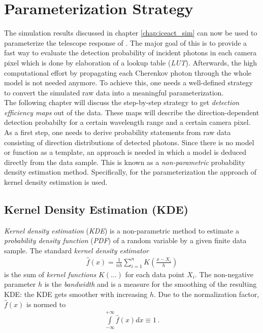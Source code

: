 \chapter{\iceact Parameterization Strategy}\label{chap:param_strategy}

The simulation results discussed in chapter \ref{chap:iceact_sim} can now be used to parameterize the telescope response of \iceact. The major goal of this is to provide a fast way to evaluate the detection probability of incident photons in each camera pixel which is done by elaboration of a lookup table (\textit{LUT}). Afterwards, the high computational effort by propagating each Cherenkov photon through the whole \geant model is not needed anymore. To achieve this, one needs a well-defined strategy to convert the simulated raw data into a meaningful parameterization.\\

The following chapter will discuss the step-by-step strategy to get \textit{detection efficiency maps} out of the \geant data. These maps will describe the direction-dependent detection probabilty for a certain wavelength range and a certain camera pixel.\\

As a first step, one needs to derive probability statements from raw data consisting of direction distributions of detected photons. Since there is no model or function as a template, an approach is needed in which a model is deduced directly from the data sample. This is known as a \textit{non-parametric} probability density estimation method. Specifically, for the \iceact parameterization the approach of kernel density estimation is used.
\newpage

\section{Kernel Density Estimation (KDE)}

\textit{Kernel density estimation} (\textit{KDE}) is a non-parametric method to estimate a \textit{probability density function} (\textit{PDF}) of a random variable by a given finite data sample. The standard \textit{kernel density estimator}
\begin{align}
	\hat{f}(x)=\frac{1}{nh}\sum_{i=1}^{n}K\left(\frac{x-X_i}{h}\right)
	\label{eq:kde}
\end{align}
is the sum of \textit{kernel functions} $K(\dots)$ for each data point $X_i$. The non-negative parameter $h$ is the \textit{bandwidth} and is a measure for the smoothing of the resulting KDE: the KDE gets smoother with increasing $h$. Due to the normalization factor, $\hat{f}(x)$ is normed to
\begin{align}
	\int\limits_{-\infty}^{+\infty}\hat{f}(x)dx \equiv 1\,.
	\label{kde:norm}
\end{align}

